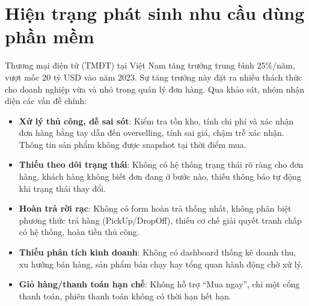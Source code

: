
\section{Hiện trạng phát sinh nhu cầu dùng phần mềm}
\label{sec:current-state}

Thương mại điện tử (TMĐT) tại Việt Nam tăng trưởng trung bình 25\%/năm, vượt mốc 20 tỷ USD vào năm 2023. Sự tăng trưởng này đặt ra nhiều thách thức cho doanh nghiệp vừa và nhỏ trong quản lý đơn hàng. Qua khảo sát, nhóm nhận diện các vấn đề chính:

\begin{itemize}
    \item \textbf{Xử lý thủ công, dễ sai sót}: Kiểm tra tồn kho, tính chi phí và xác nhận đơn hàng bằng tay dẫn đến overselling, tính sai giá, chậm trễ xác nhận. Thông tin sản phẩm không được snapshot tại thời điểm mua.
    \item \textbf{Thiếu theo dõi trạng thái}: Không có hệ thống trạng thái rõ ràng cho đơn hàng, khách hàng không biết đơn đang ở bước nào, thiếu thông báo tự động khi trạng thái thay đổi.
    \item \textbf{Hoàn trả rời rạc}: Không có form hoàn trả thống nhất, không phân biệt phương thức trả hàng (PickUp/DropOff), thiếu cơ chế giải quyết tranh chấp có hệ thống, hoàn tiền thủ công.
    \item \textbf{Thiếu phân tích kinh doanh}: Không có dashboard thống kê doanh thu, xu hướng bán hàng, sản phẩm bán chạy hay tổng quan hành động chờ xử lý.
    \item \textbf{Giỏ hàng/thanh toán hạn chế}: Không hỗ trợ ``Mua ngay'', chỉ một cổng thanh toán, phiên thanh toán không có thời hạn hết hạn.
\end{itemize}

